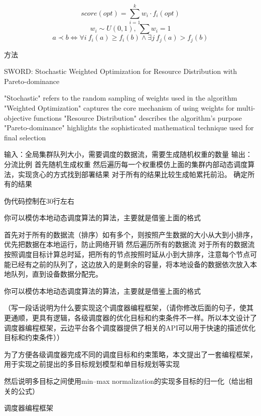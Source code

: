 \begin{equation}
score(opt) = \sum_{i=1}^{k} w_i \cdot f_i(opt)
\end{equation}
\begin{equation}
w_i \sim U(0,1),\ \sum w_i = 1
\end{equation}
\begin{equation}
a \prec b \iff \forall i\ f_i(a) \geq f_i(b) \wedge \exists j\ f_j(a) > f_j(b)
\end{equation}

方法

SWORD: Stochastic Weighted Optimization for Resource Distribution with Pareto-dominance

"Stochastic" refers to the random sampling of weights used in the algorithm
"Weighted Optimization" captures the core mechanism of using weights for multi-objective functions
"Resource Distribution" describes the algorithm's purpose
"Pareto-dominance" highlights the sophisticated mathematical technique used for final selection

输入：全局集群队列大小，需要调度的数据流，需要生成随机权重的数量
输出：分流比例
首先随机生成权重
然后遍历每一个权重模仿上面的集群内部动态调度算法，实现贪心的方式找到部署结果
对于所有的结果比较生成帕累托前沿。
确定所有的结果

伪代码控制在30行左右

你可以模仿本地动态调度算法的算法，主要就是借鉴上面的格式

首先对于所有的数据流（排序）如有多个，则按照产生数据的大小从大到小排序，优先把数据在本地运行，防止网络开销
然后遍历所有的数据流
    对于所有的数据流按照调度目标计算总时延，把所有的节点按照时延从小到大排序，注意每个节点可能已经有之前的队列了，这边放入的是剩余的容量，将本地设备的数据依次放入本地队列，直到设备数据分配完。

你可以模仿本地动态调度算法的算法，主要就是借鉴上面的格式




（写一段话说明为什么要实现这个调度器编程框架，（请你修改后面的句子，使其更通顺，更具有逻辑，各级调度器的优化目标和约束条件不一样。所以本文设计了调度器编程框架，云边平台各个调度器提供了相关的API可以用于快速的描述优化目标和约束条件））

为了方便各级调度器完成不同的调度目标和约束策略，本文提出了一套编程框架，用于实现之前提出的多目标规划模型和单目标规划等实现

然后说明多目标之间使用min–max normalization的实现多目标的归一化（给出相关的公式）

调度器编程框架

